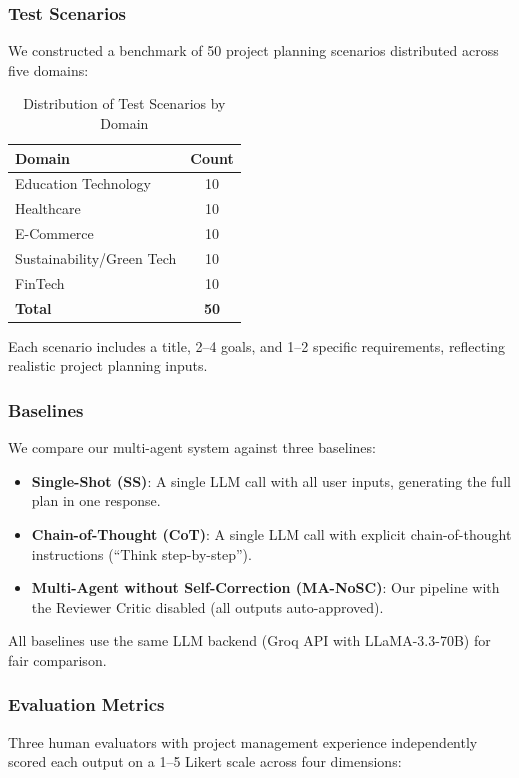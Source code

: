 \documentclass[journal]{IEEEtran}
\begin{document}
\subsubsection{Test Scenarios}
We constructed a benchmark of 50 project planning scenarios distributed across five domains:

\begin{table}[!t]
    \centering
    \caption{Distribution of Test Scenarios by Domain}
    \label{tab:scenarios}
    \begin{tabular}{@{}lc@{}}
        \toprule
        \textbf{Domain} & \textbf{Count} \\
        \midrule
        Education Technology & 10 \\
        Healthcare & 10 \\
        E-Commerce & 10 \\
        Sustainability/Green Tech & 10 \\
        FinTech & 10 \\
        \midrule
        \textbf{Total} & \textbf{50} \\
        \bottomrule
    \end{tabular}
\end{table}

Each scenario includes a title, 2--4 goals, and 1--2 specific requirements, reflecting realistic project planning inputs.

\subsubsection{Baselines}
We compare our multi-agent system against three baselines:

\begin{itemize}
    \item \textbf{Single-Shot (SS)}: A single LLM call with all user inputs, generating the full plan in one response.
    \item \textbf{Chain-of-Thought (CoT)}: A single LLM call with explicit chain-of-thought instructions (``Think step-by-step'').
    \item \textbf{Multi-Agent without Self-Correction (MA-NoSC)}: Our pipeline with the Reviewer Critic disabled (all outputs auto-approved).
\end{itemize}

All baselines use the same LLM backend (Groq API with LLaMA-3.3-70B) for fair comparison.

\subsubsection{Evaluation Metrics}
Three human evaluators with project management experience independently scored each output on a 1--5 Likert scale across four dimensions:
\end{document}
